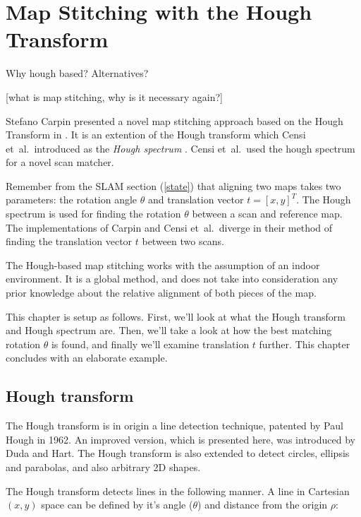 
\chapter{Map Stitching with the Hough Transform}
\label{chapter:hough}
Why hough based?
Alternatives?

[what is map stitching, why is it necessary again?]

Stefano Carpin presented a novel map stitching approach based on the Hough Transform in \cite{carpin2002merging}. It is an extention of the Hough transform which Censi et~al.\ introduced as the \emph{Hough spectrum} \cite{censi2005scan}. Censi et~al.\ used the hough spectrum for a novel scan matcher. 

Remember from the SLAM section (\ref{state}) that aligning two maps takes two parameters: the rotation angle $\theta$ and translation vector $t = [x, y]^T$. The Hough spectrum is used for finding the rotation $\theta$ between a scan and reference map. The implementations of Carpin and Censi et~al.\ diverge in their method of finding the translation vector $t$ between two scans. 

The Hough-based map stitching works with the assumption of an indoor environment. It is a global method, and does not take into consideration any prior knowledge about the relative alignment of both pieces of the map.

This chapter is setup as follows. First, we'll look at what the Hough transform and Hough spectrum are. Then, we'll take a look at how the best matching rotation $\hat\theta$ is found, and finally we'll examine translation $t$ further. This chapter concludes with an elaborate example.

\section{Hough transform}
The Hough transform is in origin a line detection technique, patented by Paul Hough in 1962\cite{hough1962method}. An improved version, which is presented here, was introduced by Duda and Hart\cite{duda1972use}. The Hough transform is also extended to detect circles, ellipsis and parabolas, and also arbitrary 2D shapes\cite{ballard1981generalizing}.

The Hough transform detects lines in the following manner. A line in Cartesian $(x, y)$ space can be defined by it's angle ($\theta$) and distance from the origin $\rho$:

